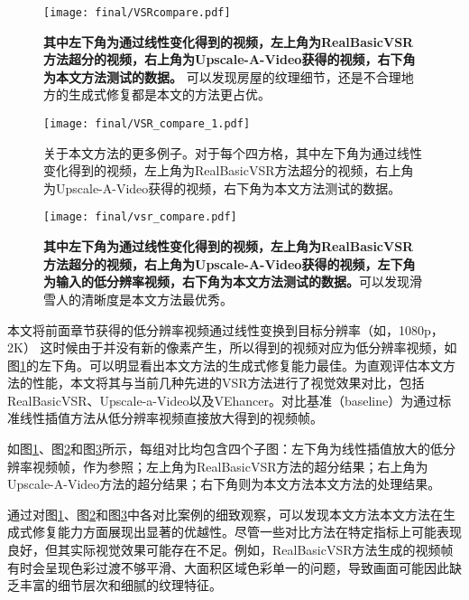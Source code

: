 \begin{figure}[h]
    \centering
    \texttt{[image: final/VSRcompare.pdf]}
    \caption{\textbf{其中左下角为通过线性变化得到的视频，左上角为RealBasicVSR方法超分的视频，右上角为Upscale-A-Video获得的视频，右下角为本文方法测试的数据。} 可以发现房屋的纹理细节，还是不合理地方的生成式修复都是本文的方法更占优。}
    \label{fig:vsr2}
\end{figure}

\begin{figure}[h]
    \centering
    \texttt{[image: final/VSR\_compare\_1.pdf]}
    \caption{关于本文方法的更多例子。对于每个四方格，其中左下角为通过线性变化得到的视频，左上角为RealBasicVSR方法超分的视频，右上角为Upscale-A-Video获得的视频，右下角为本文方法测试的数据。}
    \label{fig:vsr3}
\end{figure}

\begin{figure}[h]
    \centering
    \texttt{[image: final/vsr\_compare.pdf]}
    \caption{\textbf{其中左下角为通过线性变化得到的视频，左上角为RealBasicVSR方法超分的视频，右上角为Upscale-A-Video获得的视频，左下角为输入的低分辨率视频，右下角为本文方法测试的数据。}可以发现滑雪人的清晰度是本文方法最优秀。}
    \label{fig:vsr1}
\end{figure}


本文将前面章节获得的低分辨率视频通过线性变换到目标分辨率（如，1080p， 2K） 这时候由于并没有新的像素产生，所以得到的视频对应为低分辨率视频，如图\ref{fig:vsr2}的左下角。可以明显看出本文方法的生成式修复能力最佳。为直观评估本文方法的性能，本文将其与当前几种先进的VSR方法进行了视觉效果对比，包括RealBasicVSR\cite{RealBasicVSR}、Upscale-a-Video\cite{zhou2024upscaleavideo}以及VEhancer\cite{he2024venhancer}。对比基准（baseline）为通过标准线性插值方法从低分辨率视频直接放大得到的视频帧。

如图\ref{fig:vsr2}、图\ref{fig:vsr3}和图\ref{fig:vsr1}所示，每组对比均包含四个子图：左下角为线性插值放大的低分辨率视频帧，作为参照；左上角为RealBasicVSR方法的超分结果；右上角为Upscale-A-Video方法的超分结果；右下角则为本文方法本文方法的处理结果。


通过对图\ref{fig:vsr2}、图\ref{fig:vsr3}和图\ref{fig:vsr1}中各对比案例的细致观察，可以发现本文方法本文方法在生成式修复能力方面展现出显著的优越性。尽管一些对比方法在特定指标上可能表现良好，但其实际视觉效果可能存在不足。例如，RealBasicVSR\cite{RealBasicVSR}方法生成的视频帧有时会呈现色彩过渡不够平滑、大面积区域色彩单一的问题，导致画面可能因此缺乏丰富的细节层次和细腻的纹理特征。

